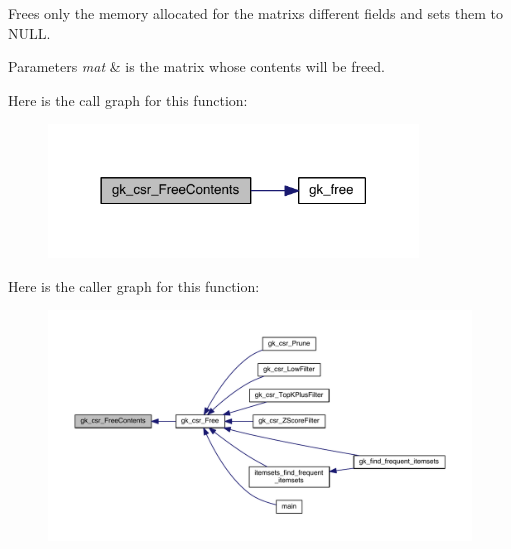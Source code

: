 Frees only the memory allocated for the matrix\textquotesingle{}s different fields and sets them to N\+U\+LL. 
\begin{DoxyParams}{Parameters}
{\em mat} & is the matrix whose contents will be freed. \\
\hline
\end{DoxyParams}
Here is the call graph for this function\+:\nopagebreak
\begin{figure}[H]
\begin{center}
\leavevmode
\includegraphics[width=278pt]{a00077_a9646f29b0605ba264bf373c441a6826d_cgraph}
\end{center}
\end{figure}
Here is the caller graph for this function\+:\nopagebreak
\begin{figure}[H]
\begin{center}
\leavevmode
\includegraphics[width=350pt]{a00077_a9646f29b0605ba264bf373c441a6826d_icgraph}
\end{center}
\end{figure}
\mbox{\label{a00077_a52c619261980e7f2d6e4b48096ee1813}} 

